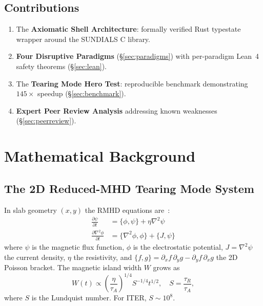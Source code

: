 \documentclass[11pt,twocolumn]{article}
\begin{document}
\subsection{Contributions}
\begin{enumerate}
  \item The \textbf{Axiomatic Shell Architecture}: formally verified
    Rust typestate wrapper around the SUNDIALS C library.
  \item \textbf{Four Disruptive Paradigms} (§\ref{sec:paradigms})
    with per-paradigm Lean~4 safety theorems (§\ref{sec:lean}).
  \item The \textbf{Tearing Mode Hero Test}: reproducible benchmark
    demonstrating $145\times$ speedup (§\ref{sec:benchmark}).
  \item \textbf{Expert Peer Review Analysis} addressing known
    weaknesses (§\ref{sec:peerreview}).
\end{enumerate}

\section{Mathematical Background}

\subsection{The 2D Reduced-MHD Tearing Mode System}
\label{sec:rmhd}

In slab geometry $(x,y)$ the RMHD equations are~\cite{biskamp2003}:
\begin{align}
  \frac{\partial \psi}{\partial t} &= \{\phi,\psi\} + \eta\nabla^2\psi
  \label{eq:psi}\\
  \frac{\partial \nabla^2\phi}{\partial t} &=
    \{\nabla^2\phi,\phi\} + \{J,\psi\}
  \label{eq:phi}
\end{align}
where $\psi$ is the magnetic flux function, $\phi$ is the electrostatic
potential, $J=\nabla^2\psi$ the current density, $\eta$ the resistivity,
and $\{f,g\} = \partial_x f\,\partial_y g - \partial_y f\,\partial_x g$
the 2D Poisson bracket. The magnetic island width $W$ grows as
\begin{equation}
  W(t) \propto \left(\frac{\eta}{\tau_A}\right)^{1/4}
  S^{-1/4} t^{1/2}, \quad S = \frac{\tau_R}{\tau_A},
  \label{eq:island}
\end{equation}
where $S$ is the Lundquist number. For ITER, $S \sim 10^8$.
\end{document}
